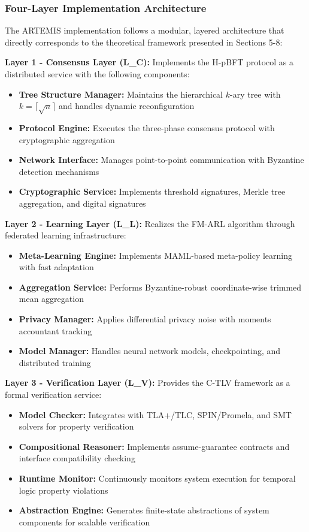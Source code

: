 \documentclass[conference]{IEEEtran}
\begin{document}
\subsubsection{Four-Layer Implementation Architecture}

The ARTEMIS implementation follows a modular, layered architecture that directly corresponds to the theoretical framework presented in Sections 5-8:

\textbf{Layer 1 - Consensus Layer (L_C):} Implements the H-pBFT protocol as a distributed service with the following components:
\begin{itemize}
    \item \textbf{Tree Structure Manager:} Maintains the hierarchical $k$-ary tree with $k = \lceil \sqrt{n} \rceil$ and handles dynamic reconfiguration
    \item \textbf{Protocol Engine:} Executes the three-phase consensus protocol with cryptographic aggregation
    \item \textbf{Network Interface:} Manages point-to-point communication with Byzantine detection mechanisms
    \item \textbf{Cryptographic Service:} Implements threshold signatures, Merkle tree aggregation, and digital signatures
\end{itemize}

\textbf{Layer 2 - Learning Layer (L_L):} Realizes the FM-ARL algorithm through federated learning infrastructure:
\begin{itemize}
    \item \textbf{Meta-Learning Engine:} Implements MAML-based meta-policy learning with fast adaptation
    \item \textbf{Aggregation Service:} Performs Byzantine-robust coordinate-wise trimmed mean aggregation
    \item \textbf{Privacy Manager:} Applies differential privacy noise with moments accountant tracking
    \item \textbf{Model Manager:} Handles neural network models, checkpointing, and distributed training
\end{itemize}

\textbf{Layer 3 - Verification Layer (L_V):} Provides the C-TLV framework as a formal verification service:
\begin{itemize}
    \item \textbf{Model Checker:} Integrates with TLA+/TLC, SPIN/Promela, and SMT solvers for property verification
    \item \textbf{Compositional Reasoner:} Implements assume-guarantee contracts and interface compatibility checking
    \item \textbf{Runtime Monitor:} Continuously monitors system execution for temporal logic property violations
    \item \textbf{Abstraction Engine:} Generates finite-state abstractions of system components for scalable verification
\end{itemize}
\end{document}

